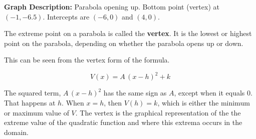 \documentclass{ximera}
\begin{document}
\begin{image}
\end{image}

\textbf{Graph Description:} Parabola opening up. Bottom point (vertex) at $(-1,-6.5)$. Intercepts are $(-6,0)$ and $(4,0)$.








The extreme point on a parabola is called the \textbf{vertex}.  It is the lowest or highest point on the parabola, depending on whether the parabola opens up or down. 

This can be seen from the vertex form of the formula.




\[
V(x) = A \, (x - h)^2 + k
\]

The squared term, $A \, (x - h)^2$ has the same sign as $A$, except when it equals $0$.  That happens at $h$.  When $x = h$, then $V(h) = k$, which is either the minimum or maximum value of $V$.  The vertex is the graphical representation of the the extreme value of the quadratic function and where this extrema occurs in the domain.
\end{document}

